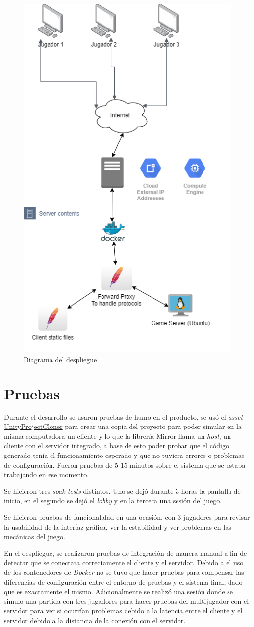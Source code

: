 \begin{figure}[h]
    \centering
    \includegraphics[width=0.5\linewidth]{images/diagrama_deployment.png}
    \caption{Diagrama del despliegue}
    \label{fig:diagrama_despliege}
\end{figure}

\section{Pruebas}
Durante el desarrollo se usaron pruebas de humo en el producto, se usó el \textit{asset} \href{https://github.com/hwaet/UnityProjectCloner}{UnityProjectCloner} para crear una copia del proyecto para poder simular en la misma computadora un cliente y lo que la librería Mirror llama un \textit{host}, un cliente con el servidor integrado, a base de esto poder probar que el código generado tenía el funcionamiento esperado y que no tuviera errores o problemas de configuración. Fueron pruebas de 5-15 minutos sobre el sistema que se estaba trabajando en ese momento.

Se hicieron tres \textit{soak tests} distintos. Uno se dejó durante 3 horas la pantalla de inicio, en el segundo se dejó el \textit{lobby} y en la tercera una sesión del juego.

Se hicieron pruebas de funcionalidad en una ocasión, con 3 jugadores para revisar la usabilidad de la interfaz gráfica, ver la estabilidad y ver problemas en las mecánicas del juego.

En el despliegue, se realizaron pruebas de integración de manera manual a fin de detectar que se conectara correctamente el cliente y el servidor. Debido a el uso de los contenedores de \textit{Docker} no se tuvo que hacer pruebas para compensar las diferencias de configuración entre el entorno de pruebas y el sistema final, dado que es exactamente el mismo. Adicionalmente se realizó una sesión donde se simulo una partida con tres jugadores para hacer pruebas del multijugador con el servidor para ver si ocurrían problemas debido a la latencia entre el cliente y el servidor debido a la distancia de la conexión con el servidor.
